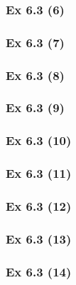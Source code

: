 \subsubsection{Ex 6.3 (6)}\label{sec:Ex_6.3.6}

\subsubsection{Ex 6.3 (7)}\label{sec:Ex_6.3.7}

\subsubsection{Ex 6.3 (8)}\label{sec:Ex_6.3.8}

\subsubsection{Ex 6.3 (9)}\label{sec:Ex_6.3.9}

\subsubsection{Ex 6.3 (10)}\label{sec:Ex_6.3.10}

\newpage		%


\subsubsection{Ex 6.3 (11)}\label{sec:Ex_6.3.11}

\subsubsection{Ex 6.3 (12)}\label{sec:Ex_6.3.12}

\subsubsection{Ex 6.3 (13)}\label{sec:Ex_6.3.13}

\subsubsection{Ex 6.3 (14)}\label{sec:Ex_6.3.14}

